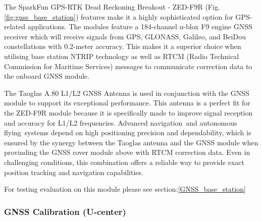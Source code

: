 \documentclass{article}
\begin{document}
The SparkFun GPS-RTK Dead Reckoning Breakout - ZED-F9R (Fig.\ref{fig:gnss_base_station}) features make it a highly sophisticated option for GPS-related applications. The modules feature a 184-channel u-blox F9 engine GNSS receiver which will receive signals from GPS, GLONASS, Galileo, and BeiDou 
constellations with 0.2-meter accuracy. This makes it a superior choice when utilising base station NTRIP technology as well as RTCM (Radio Technical Commission for Maritime Services) messages to communicate correction data to the onboard GNSS module.

The Taoglas A.80 L1/L2 GNSS Antenna is used in conjunction with the GNSS module to support its exceptional performance. This antenna is a perfect fit for the ZED-F9R module because it is specifically made to improve signal reception and accuracy for L1/L2 frequencies. Advanced navigation and 
autonomous flying systems depend on high positioning precision and dependability, which is ensured by the synergy between the Taoglas antenna and the GNSS module when provinding the GNSS rover module above with RTCM correction data. Even in challenging conditions, this combination offers a reliable way to provide exact position tracking and navigation capabilities.

For testing evaluation on this module please see section:\ref{GNSS_base_station}

\subsubsection{GNSS Calibration (U-center)}
\end{document}

